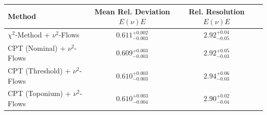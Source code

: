     \begin{tabular}{lccc}
        \toprule
        Method & Mean Rel. Deviation $E(\nu)E$ & Rel. Resolution $E(\nu)E$ \\
        \midrule
        $\chi^2$-Method + $\nu^2$-Flows & $0.611^{+0.002}_{-0.003}$ & $2.92^{+0.04}_{-0.05}$ \\
        CPT (Nominal) + $\nu^2$-Flows & $0.609^{+0.003}_{-0.003}$ & $2.92^{+0.05}_{-0.03}$ \\
        CPT (Threshold) + $\nu^2$-Flows & $0.610^{+0.003}_{-0.003}$ & $2.94^{+0.06}_{-0.03}$ \\
        CPT (Toponium) + $\nu^2$-Flows & $0.610^{+0.003}_{-0.004}$ & $2.90^{+0.02}_{-0.04}$ \\
        \bottomrule
    \end{tabular}